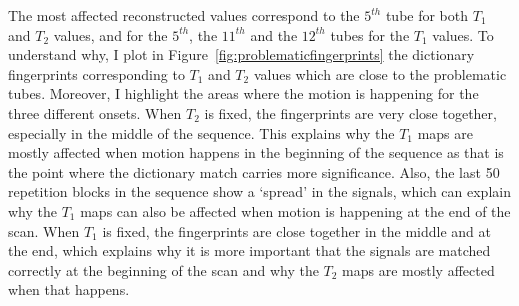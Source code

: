 The most affected reconstructed values correspond to the $5^{th}$ tube for both $T_1$ and $T_2$ values, and for the $5^{th}$, the $11^{th}$ and the $12^{th}$ tubes for the $T_1$ values.
To understand why, I plot in Figure~\ref{fig:problematicfingerprints} the dictionary fingerprints corresponding to $T_1$ and $T_2$ values which are close to the problematic tubes.
Moreover, I highlight the areas where the motion is happening for the three different onsets.
When $T_2$ is fixed, the fingerprints are very close together, especially in the middle of the sequence.
This explains why the $T_1$ maps are mostly affected when motion happens in the beginning of the sequence as that is the point where the dictionary match carries more significance.
Also, the last 50 repetition blocks in the sequence show a `spread' in the signals, which can explain why the $T_1$ maps can also be affected when motion is happening at the end of the scan.
When $T_1$ is fixed, the fingerprints are close together in the middle and at the end, which explains why it is more important that the signals are matched correctly at the beginning of the scan and why the $T_2$ maps are mostly affected when that happens.

